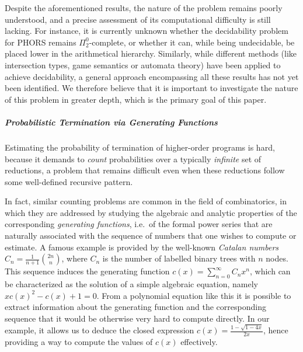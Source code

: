 Despite the aforementioned results, the nature of the problem remains poorly understood, and a precise assessment of its computational difficulty is still lacking. For instance, it is currently unknown whether the decidability problem for PHORS remains $\Pi^0_2$-complete, or whether it can, while being undecidable, be placed lower in the arithmetical hierarchy. Similarly, while different methods (like intersection types, game semantics or automata theory) have been applied to achieve decidability, a general approach encompassing all these results has not yet been identified. We therefore believe that it is important to investigate the nature of this problem in greater depth, which is the primary goal of this paper.


%
%
%


\subparagraph*{Probabilistic Termination via Generating Functions}

Estimating the probability of termination of higher-order programs is hard, because it demands to \emph{count} probabilities over a typically \emph{infinite} set of reductions, a problem that remains difficult even when these reductions follow some well-defined recursive pattern. 

In fact, similar counting problems are common in the field of combinatorics, in which they are addressed by studying the algebraic and analytic properties of the corresponding \emph{generating functions}, i.e.~of the formal power series that are naturally associated with the sequence of numbers that one wishes to compute or estimate.   
A famous example is provided by the well-known \emph{Catalan numbers} $C_n=\frac{1}{n+1}\binom{2n}{n}$, where $C_n$ is the number of labelled binary trees with $n$ nodes. 
This sequence induces the generating function $c(x)=\sum_{n=0}^{\infty}C_n x^n$, which can be characterized as the solution of a simple algebraic equation, namely $xc(x)^2-c(x)+1=0$. 
From a polynomial equation like this it is possible to extract information about the generating function and the corresponding sequence that it would be otherwise very hard to compute directly.
In our example, it allows us to deduce the closed expression $c(x)=\frac{1-\sqrt{1-4x}}{2x}$, hence providing a way to compute the values of $c(x)$ effectively.

